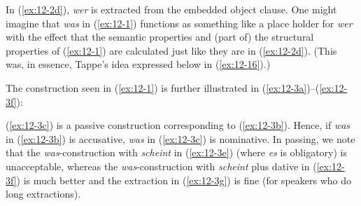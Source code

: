 \documentclass[output=paper]{langsci/langscibook}
\begin{document}
In (\ref{ex:12-2d}), \textit{wer} is extracted from the embedded object
clause. One might imagine that \textit{was} in (\ref{ex:12-1}) functions as
something like a place holder for \textit{wer} with the effect that
the semantic properties and (part of) the structural properties of (\ref{ex:12-1})
are calculated just like they are in (\ref{ex:12-2d}). (This was, in essence,
Tappe's idea expressed below in (\ref{ex:12-16}).)

The construction seen in (\ref{ex:12-1}) is further illustrated in (\ref{ex:12-3a})--(\ref{ex:12-3f}):
\begin{exe}
\ex
\label{ex:12-3}
\begin{xlist}
\end{xlist}
\end{exe}    
(\ref{ex:12-3c}) is a passive construction corresponding to (\ref{ex:12-3b}). Hence, if \textit{was} in (\ref{ex:12-3b}) is accusative, \textit{was} in (\ref{ex:12-3c}) is nominative. In
passing, we note that the \textit{was}-construction with
\textit{scheint} in (\ref{ex:12-3e}) (where \textit{es} is obligatory) is
unacceptable, whereas the \textit{was}-construction with \textit{scheint}
plus dative in (\ref{ex:12-3f}) is much better and the extraction in (\ref{ex:12-3g}) is
fine (for speakers who do long extractions).
\end{document}
